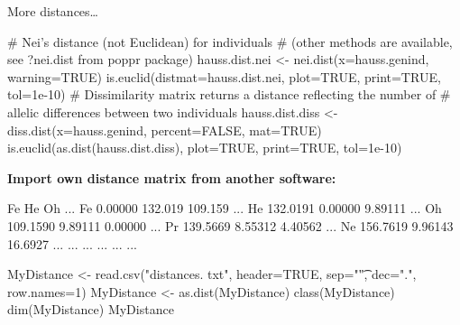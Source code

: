 \documentclass[compress, ucs, xelatex, 11pt, xcolor=svgnames, aspectratio=169,
	hyperref={
		bookmarks=true,
		unicode=true,
		colorlinks=true,
		pdftitle={Molecular data in R},
		plainpages=false,
		pdfauthor={Vojtech Zeisek},
		pdfsubject={Course about phylogeny and evolution in R},
		pdfcreator={XeLaTeX},
		pdfkeywords={R, evolution, phylogeny, molecular data},
		linkcolor=Crimson, %
		anchorcolor=Magenta, %
		citecolor=Magenta, %
		filecolor=Magenta, %
		menucolor=Magenta, %
		urlcolor=DodgerBlue, %
		pdftex},
	url={hyphens, lowtilde} %
	]{beamer}
\begin{document}
\begin{frame}[fragile]{More distances\ldots}
	\begin{spluscode}
    # Nei's distance (not Euclidean) for individuals
    # (other methods are available, see ?nei.dist from poppr package)
    hauss.dist.nei <- nei.dist(x=hauss.genind, warning=TRUE)
    is.euclid(distmat=hauss.dist.nei, plot=TRUE, print=TRUE, tol=1e-10)
    # Dissimilarity matrix returns a distance reflecting the number of
    # allelic differences between two individuals
    hauss.dist.diss <- diss.dist(x=hauss.genind, percent=FALSE, mat=TRUE)
    is.euclid(as.dist(hauss.dist.diss), plot=TRUE, print=TRUE, tol=1e-10)
	\end{spluscode}
	\vfill
	\textbf{Import own distance matrix from another software:}
	\begin{multicols}{2}
		\begin{spluscode}
       Fe       He      Oh      ...
    Fe 0.00000  132.019 109.159 ...
    He 132.0191 0.00000 9.89111 ...
    Oh 109.1590 9.89111 0.00000 ...
    Pr 139.5669 8.55312 4.40562 ...
    Ne 156.7619 9.96143 16.6927 ...
    ... ...     ...     ...     ...
		\end{spluscode}
		\columnbreak
		\begin{spluscode}
    MyDistance <- read.csv("distances.
      txt", header=TRUE, sep="\t",
      dec=".", row.names=1)
    MyDistance <- as.dist(MyDistance)
    class(MyDistance)
    dim(MyDistance)
    MyDistance
		\end{spluscode}
	\end{multicols}
\end{frame}
\end{document}
